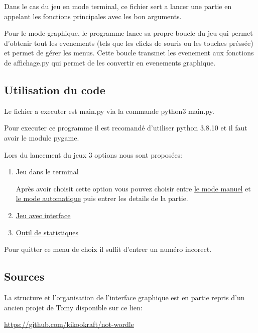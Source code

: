 \documentclass{scrartcl}
\newcommand{\ts}[1]{{\fontfamily{pcr}\selectfont #1}}
\begin{document}
Dans le cas du jeu en mode terminal, ce fichier sert a lancer une partie en appelant les fonctions principales avec les bon arguments.

Pour le mode graphique, le programme lance sa propre boucle du jeu qui permet d'obtenir tout les evenements (tels que les clicks de souris ou les touches préssée)
et permet de gérer les menus. 
Cette boucle transmet les evenement aux fonctions de \ts{affichage.py} qui permet de les convertir en evenements graphique.
\subsection{Utilisation du code}
Le fichier a executer est \ts{main.py} via la commande \ts{python3 main.py}. 

Pour executer ce programme il est recomandé d'utiliser python 3.8.10 et il faut avoir le module pygame.

Lors du lancement du jeux 3 options nous sont proposées:
\begin{enumerate}
    \item Jeu dans le terminal
    
    Après avoir choisit cette option vous pouvez choisir entre \hyperref[subsec:mode_m]{le mode manuel} et \hyperref[subsec:mode_a]{le mode automatique} puis entrer les details de la partie.
    \item \hyperref[subsec:IG]{Jeu avec interface}
    \item \hyperref[subsec:stats]{Outil de statistiques}
\end{enumerate}
Pour quitter ce menu de choix il suffit d'entrer un numéro incorect.
\subsection{Sources}
La structure et l'organisation de l'interface graphique est en partie repris d'un ancien projet de Tomy disponible sur ce lien:  
 
\url{https://github.com/kikookraft/not-wordle}
\end{document}

